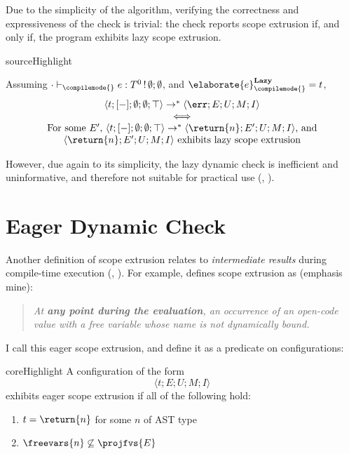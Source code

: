 Due to the simplicity of the algorithm, verifying the correctness and expressiveness of the check is trivial: the check reports scope extrusion if, and only if, the program exhibits lazy scope extrusion.

\begin{theorem}{sourceHighlight}

Assuming $\cdot \vdash_{\compilemode{}} e: T^0 \, ! \, \emptyset;\emptyset$, and $\elaborate{e}_{\compilemode{}}^{\textbf{Lazy}} = t$, 
\[\begin{array}{c}
\langle t; [-]; \emptyset; \emptyset; \top \rangle \to^{*} \langle \err; E; U; M; I \rangle \\
\iff \\
\text{For some $E'$, }
\langle t; [-]; \emptyset; \emptyset; \top \rangle \to^{*} \langle \return{n}; E'; U; M; I \rangle\text{, and}\\
\langle \return{n}; E'; U; M; I \rangle \text{ exhibits lazy scope extrusion}
\end{array}
\]
\end{theorem}

However, due again to its simplicity, the lazy dynamic check is inefficient and uninformative, and therefore not suitable for practical use \citep{kiselyov-14} (, ).

\section{Eager Dynamic Check}\label{section:eager-dynamic-check-formal}
Another definition of scope extrusion relates to \textit{intermediate results} during compile-time execution (, ). For example, \citet{kiselyov-14} defines scope extrusion as (emphasis mine):

\begin{quote}
  \textit{At \textbf{any point during the evaluation}, an occurrence of an open-code value with a free variable whose name is not dynamically bound.}
\end{quote}

I call this eager scope extrusion, and define it as a predicate on \coreLang{} configurations: 
\begin{definition}{coreHighlight} A \coreLang{} configuration of the form 
\[\langle t;E;U;M;I\rangle\]  
exhibits eager scope extrusion if all of the following hold:
  \begin{enumerate}
    \item $t = \return{n}$ for some $n$ of \textsf{AST} type
    \item $\freevars{n} \not\subseteq \projfvs{E}$
  \end{enumerate}
\end{definition}

